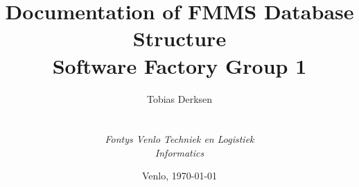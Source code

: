 
\def\Company{\textit{FSG1 - Fontys SoFa Group 1}}
\def\Institute{\textit{Fontys Venlo Techniek en Logistiek}}
\def\Course{\textit{Informatics}}

\def\BoldTitle{Documentation of FMMS Database Structure}
\def\Subtitle{Software Factory Group 1}
\def\Authors{Tobias Derksen}


\title{\textbf{\BoldTitle}\\\Subtitle}
\author{\Authors \\ \\ \\ \Institute\\ \Course}
\date{Venlo, \today}


\newenvironment{constraint}[1]{
	\newcommand{\Header}[1]{\textbf{##1}}
	\newcommand{\Row}[2]{\Header{##1} & ##2 \\ \hline}
	
	\newcommand{\Schema}[1]{\Row{Schema}{##1}}
	\newcommand{\Table}[1]{\Row{Table}{##1}}
	\newcommand{\Column}[1]{\Row{Column}{##1}}
	
	\newcommand{\Description}[1]{\Row{Description}{##1}}
	
	
	\newcommand{\NotNull}[1]{\Row{Schema}{##1}}
	
	\begin{table}[H]
		\centering
		\label{constraint:#1}
		\begin{tabular}{|p{0.3\textwidth}|p{0.7\textwidth}|}
			\hline
}{
		\end{tabular}
		\caption{#1}
	\end{table}
}